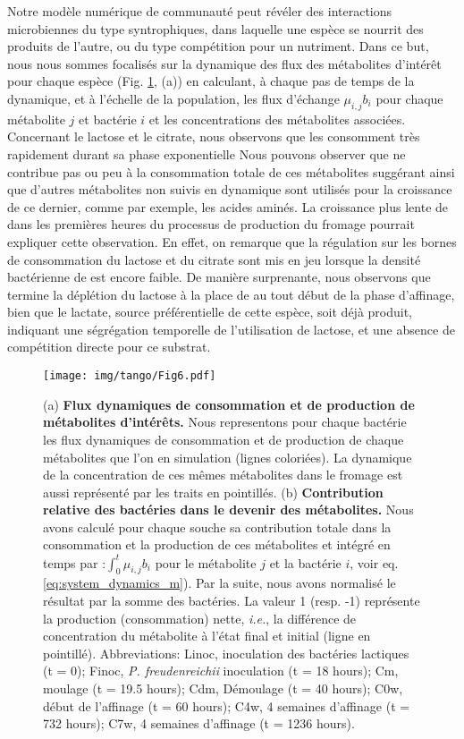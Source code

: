 Notre modèle numérique de communauté peut révéler des interactions microbiennes du type syntrophiques, dans laquelle une espèce se nourrit des produits de l'autre, ou du type compétition pour un nutriment. Dans ce but, nous nous sommes focalisés sur la dynamique des flux des métabolites d'intérêt pour chaque espèce (Fig. \ref{fig:flux-contrib}, (a)) en calculant, à chaque pas de temps de la dynamique, et à l'échelle de la population, les flux d'échange $\mu_{i,j} b_i$ pour chaque métabolite $j$ et bactérie $i$ et les concentrations des métabolites associées. Concernant le lactose et le citrate, nous observons que \lactis les consomment très rapidement durant sa phase exponentielle Nous pouvons observer que \plantarum ne contribue pas ou peu à la consommation totale de ces métabolites suggérant ainsi que d'autres métabolites non suivis en dynamique sont utilisés pour la croissance de ce dernier, comme par exemple, les acides aminés. La croissance plus lente de \plantarum dans les premières heures du processus de production du fromage pourrait expliquer cette observation. En effet, on remarque que la régulation sur les bornes de consommation du lactose et du citrate sont mis en jeu lorsque la densité bactérienne de \plantarum est encore faible. De manière surprenante, nous observons que \freud termine la déplétion du lactose à la place de \plantarum au tout début de la phase d'affinage, bien que le lactate, source préférentielle de cette espèce, soit déjà produit, indiquant une ségrégation temporelle de l'utilisation de lactose, et une absence de compétition directe pour ce substrat.

\begin{figure}[H]  
    \centering
        \texttt{[image: img/tango/Fig6.pdf]}
        \caption{(a) \textbf{Flux dynamiques de consommation et de production de métabolites d'intérêts.} Nous representons pour chaque bactérie les flux dynamiques de consommation et de production de chaque métabolites que l'on en simulation (lignes coloriées). La dynamique de la concentration de ces mêmes métabolites dans le fromage est aussi représenté par les traits en pointillés. (b) \textbf{Contribution relative des bactéries dans le devenir des métabolites.} Nous avons calculé pour chaque souche sa contribution totale dans la consommation et la production de ces métabolites et intégré en temps par :$\int_0^t \mu_{i,j} b_i$ pour le métabolite $j$ et la bactérie $i$, voir eq.\ref{eq:system_dynamics_m}). Par la suite, nous avons normalisé le résultat par la somme des bactéries. La valeur 1 (resp. -1) représente la production (consommation) nette, \textit{i.e.}, la différence de concentration du métabolite à l'état final et initial (ligne en pointillé).  Abbreviations: Linoc, inoculation des bactéries lactiques (t = 0); Finoc, \textit{P. freudenreichii} inoculation (t = 18 hours); Cm, moulage (t = 19.5 hours); Cdm, Démoulage (t = 40 hours); C0w, début de l'affinage (t = 60 hours); C4w, 4 semaines d'affinage (t = 732 hours); C7w, 4 semaines d'affinage (t = 1236 hours).}
        \label{fig:flux-contrib}
    \end{figure}
    

